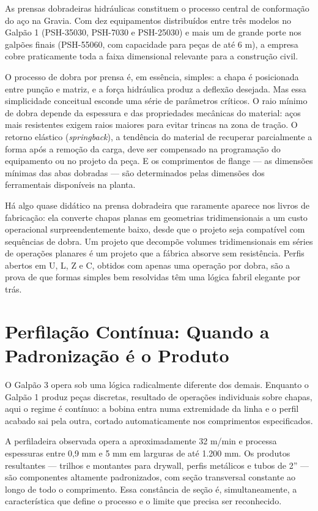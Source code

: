 \documentclass[12pt,a4paper,oneside,brazil,chapter=TITLE]{article}
\newcommand{\secbreak}{\clearpage}
\let\oldsection\section
\renewcommand{\section}{\secbreak\oldsection}
\begin{document}
As prensas dobradeiras hidráulicas constituem o processo central de conformação do aço na Gravia. Com dez equipamentos distribuídos entre três modelos no Galpão 1 (PSH-35030, PSH-7030 e PSH-25030) e mais um de grande porte nos galpões finais (PSH-55060, com capacidade para peças de até 6 m), a empresa cobre praticamente toda a faixa dimensional relevante para a construção civil.

O processo de dobra por prensa é, em essência, simples: a chapa é posicionada entre punção e matriz, e a força hidráulica produz a deflexão desejada. Mas essa simplicidade conceitual esconde uma série de parâmetros críticos. O raio mínimo de dobra depende da espessura e das propriedades mecânicas do material: aços mais resistentes exigem raios maiores para evitar trincas na zona de tração. O retorno elástico (\textit{springback}), a tendência do material de recuperar parcialmente a forma após a remoção da carga, deve ser compensado na programação do equipamento ou no projeto da peça. E os comprimentos de flange --- as dimensões mínimas das abas dobradas --- são determinados pelas dimensões dos ferramentais disponíveis na planta.

Há algo quase didático na prensa dobradeira que raramente aparece nos livros de fabricação: ela converte chapas planas em geometrias tridimensionais a um custo operacional surpreendentemente baixo, desde que o projeto seja compatível com sequências de dobra. Um projeto que decompõe volumes tridimensionais em séries de operações planares é um projeto que a fábrica absorve sem resistência. Perfis abertos em U, L, Z e C, obtidos com apenas uma operação por dobra, são a prova de que formas simples bem resolvidas têm uma lógica fabril elegante por trás.

\section{Perfilação Contínua: Quando a Padronização é o Produto}

O Galpão 3 opera sob uma lógica radicalmente diferente dos demais. Enquanto o Galpão 1 produz peças discretas, resultado de operações individuais sobre chapas, aqui o regime é contínuo: a bobina entra numa extremidade da linha e o perfil acabado sai pela outra, cortado automaticamente nos comprimentos especificados.

A perfiladeira observada opera a aproximadamente 32 m/min e processa espessuras entre 0,9 mm e 5 mm em larguras de até 1.200 mm. Os produtos resultantes --- trilhos e montantes para drywall, perfis metálicos e tubos de 2'' --- são componentes altamente padronizados, com seção transversal constante ao longo de todo o comprimento. Essa constância de seção é, simultaneamente, a característica que define o processo e o limite que precisa ser reconhecido.
\end{document}

